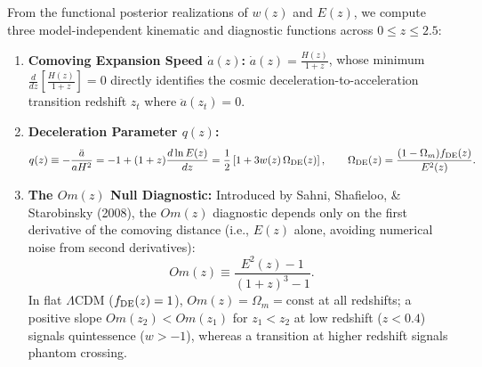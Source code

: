 \documentclass[11pt,letterpaper]{article}
\begin{document}
From the functional posterior realizations of $w(z)$ and $E(z)$, we compute three model-independent kinematic and diagnostic functions across $0 \le z \le 2.5$:
\begin{enumerate}
    \setlength{\itemsep}{3pt}
    \item \textbf{Comoving Expansion Speed $\dot{a}(z)$:} $\dot{a}(z) = \frac{H(z)}{1+z}$, whose minimum $\frac{d}{dz}\left[\frac{H(z)}{1+z}\right] = 0$ directly identifies the cosmic deceleration-to-acceleration transition redshift $z_t$ where $\ddot{a}(z_t) = 0$.
    \item \textbf{Deceleration Parameter $q(z)$:}
    \begin{equation}
        q(z) \equiv -\frac{\ddot{a}}{a H^2} = -1 + (1+z)\frac{d\ln E(z)}{dz} = \frac{1}{2}\left[ 1 + 3 w(z)\, \Omega_{\rm DE}(z) \right], \qquad \Omega_{\rm DE}(z) = \frac{(1-\Omega_m)f_{\rm DE}(z)}{E^2(z)}.
        \label{eq:qz_gp}
    \end{equation}
    \item \textbf{The $Om(z)$ Null Diagnostic:} Introduced by Sahni, Shafieloo, \& Starobinsky (2008), the $Om(z)$ diagnostic depends only on the first derivative of the comoving distance (i.e., $E(z)$ alone, avoiding numerical noise from second derivatives):
    \begin{equation}
        Om(z) \equiv \frac{E^2(z) - 1}{(1+z)^3 - 1}.
        \label{eq:Om_diagnostic}
    \end{equation}
    In flat $\Lambda$CDM ($f_{\rm DE}(z) = 1$), $Om(z) = \Omega_m = \text{const}$ at all redshifts; a positive slope $Om(z_2) < Om(z_1)$ for $z_1 < z_2$ at low redshift ($z < 0.4$) signals quintessence ($w > -1$), whereas a transition at higher redshift signals phantom crossing.
\end{enumerate}
\end{document}
